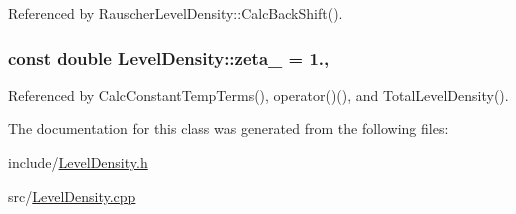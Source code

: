 Referenced by Rauscher\-Level\-Density\-::\-Calc\-Back\-Shift().

\hypertarget{classLevelDensity_a0b95afe91b297932f43c75cbcedf3ff9}{
\subsubsection[{zeta\-\_\-}]{\setlength{\rightskip}{0pt plus 5cm}const double Level\-Density\-::zeta\-\_\- = 1.\hspace{0.3cm}{\ttfamily [static]}, {\ttfamily [protected]}}}\label{classLevelDensity_a0b95afe91b297932f43c75cbcedf3ff9}


Referenced by Calc\-Constant\-Temp\-Terms(), operator()(), and Total\-Level\-Density().



The documentation for this class was generated from the following files\-:\begin{DoxyCompactItemize}
\item 
include/\hyperlink{LevelDensity_8h}{Level\-Density.\-h}\item 
src/\hyperlink{LevelDensity_8cpp}{Level\-Density.\-cpp}\end{DoxyCompactItemize}
